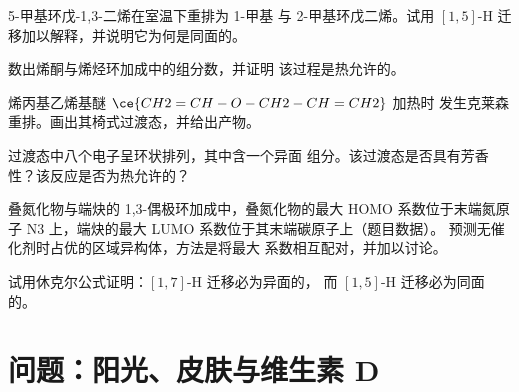 \begin{exercise}[$\star\star$]\label{exo:b3:pericyclic:7}
5-甲基环戊-1,3-二烯在室温下重排为 1-甲基
与 2-甲基环戊二烯。试用 $[1,5]$-H 迁移加以解释，并说明它为何是同面的。
\end{exercise}

\begin{exercise}[$\star\star$]\label{exo:b3:pericyclic:8}
数出烯酮与烯烃环加成中的组分数，并证明
该过程是热允许的。
\end{exercise}

\begin{exercise}[$\star\star$]\label{exo:b3:pericyclic:9}
烯丙基乙烯基醚 $\ce{CH2=CH-O-CH2-CH=CH2}$ 加热时
发生克莱森重排。画出其椅式过渡态，并给出产物。
\end{exercise}

\begin{exercise}[$\star\star\star$]\label{exo:b3:pericyclic:10}
过渡态中八个电子呈环状排列，其中含一个异面
组分。该过渡态是否具有芳香性？该反应是否为热允许的？
\end{exercise}

\begin{exercise}[$\star\star\star$]\label{exo:b3:pericyclic:11}
叠氮化物与端炔的 1,3-偶极环加成中，叠氮化物的最大
HOMO 系数位于末端氮原子 N3 上，端炔的最大
LUMO 系数位于其末端碳原子上（题目数据）。
预测无催化剂时占优的区域异构体，方法是将最大
系数相互配对，并加以讨论。
\end{exercise}

\begin{exercise}[$\star\star\star$]\label{exo:b3:pericyclic:12}
试用休克尔公式证明：$[1,7]$-H 迁移必为异面的，
而 $[1,5]$-H 迁移必为同面的。
\end{exercise}

\clearpage
\enlargethispage{3\baselineskip}
\section{问题：阳光、皮肤与维生素 D}

